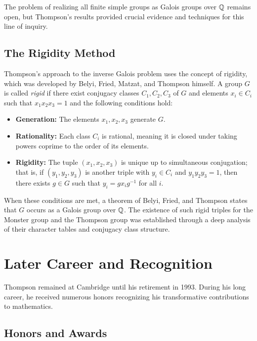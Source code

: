 The problem of realizing all finite simple groups as Galois groups over \(\mathbb{Q}\) remains open, but Thompson's results provided crucial evidence and techniques for this line of inquiry.

\subsection{The Rigidity Method}

Thompson's approach to the inverse Galois problem uses the concept of rigidity, which was developed by Belyi, Fried, Matzat, and Thompson himself. A group \(G\) is called \textit{rigid} if there exist conjugacy classes \(C_1, C_2, C_3\) of \(G\) and elements \(x_i \in C_i\) such that \(x_1 x_2 x_3 = 1\) and the following conditions hold:

\begin{itemize}
\item \textbf{Generation:} The elements \(x_1, x_2, x_3\) generate \(G\).
\item \textbf{Rationality:} Each class \(C_i\) is rational, meaning it is closed under taking powers coprime to the order of its elements.
\item \textbf{Rigidity:} The tuple \((x_1, x_2, x_3)\) is unique up to simultaneous conjugation; that is, if \((y_1, y_2, y_3)\) is another triple with \(y_i \in C_i\) and \(y_1 y_2 y_3 = 1\), then there exists \(g \in G\) such that \(y_i = g x_i g^{-1}\) for all \(i\).
\end{itemize}

When these conditions are met, a theorem of Belyi, Fried, and Thompson states that \(G\) occurs as a Galois group over \(\mathbb{Q}\). The existence of such rigid triples for the Monster group and the Thompson group was established through a deep analysis of their character tables and conjugacy class structure.

\section{Later Career and Recognition}

Thompson remained at Cambridge until his retirement in 1993. During his long career, he received numerous honors recognizing his transformative contributions to mathematics.

\subsection{Honors and Awards}

